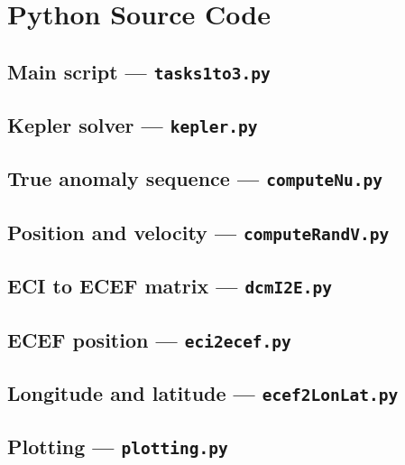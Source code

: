 \section{Python Source Code}
\label{app:code}

\subsection{Main script --- \texttt{tasks1to3.py}}


\clearpage
\subsection{Kepler solver --- \texttt{kepler.py}}


\subsection{True anomaly sequence --- \texttt{computeNu.py}}


\subsection{Position and velocity --- \texttt{computeRandV.py}}


\subsection{ECI to ECEF matrix --- \texttt{dcmI2E.py}}


\subsection{ECEF position --- \texttt{eci2ecef.py}}


\subsection{Longitude and latitude --- \texttt{ecef2LonLat.py}}


\clearpage
\subsection{Plotting --- \texttt{plotting.py}}

